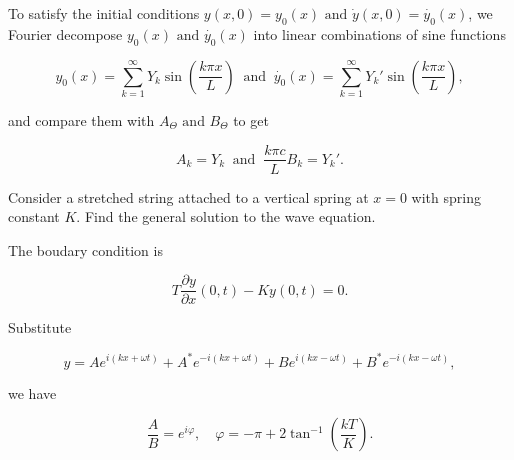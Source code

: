 \documentclass[a4paper,12pt]{report}
\begin{document}
{To satisfy the initial conditions \(y(x,0) = y_0 (x) \text { and } \dot{y}(x,0) = \dot{y_0 }(x)  \), we Fourier decompose \(y_0 (x) \text { and } \dot{y_0 }(x) \) into linear combinations of sine functions 

\begin{equation}
	y_0 (x) = \sum_{k=1}^{\infty} Y_{k}\sin \left( \frac{k\pi x}{L}  \right) ~\text { and }~ \dot{y_0 }(x) = \sum_{k=1}^{\infty} Y_{k}' \sin \left( \frac{k \pi x}{L}  \right),   
\end{equation}

and compare them with \(A_{\Theta } \text { and } B_{\Theta }  \) to get

\begin{equation}
	A_{k} = Y_{k} ~\text { and }~ \frac{k\pi c}{L} B_{k} = Y_{k}'.    
\end{equation}}

{Consider a stretched string attached to a vertical spring at \(x=0\) with spring constant \(K\). Find the general solution to the wave equation. }
{The boudary condition is 

\begin{equation}
	T \frac{\partial y}{\partial x} (0,t) - K y(0,t) = 0. 
\end{equation}

Substitute 

\begin{equation}
	y = A e^{i (kx+\omega t)} + A^* e^{-i (kx+\omega t)} + B e^{i (kx-\omega t)} + B^* e^{-i (kx-\omega t)},  
\end{equation}

we have

\begin{equation}
	\frac{A}{B} = e^{i \varphi }, \quad \varphi  = - \pi + 2\tan ^{-1} \left( \frac{kT}{K}  \right).
\end{equation}

} 
\end{document}
